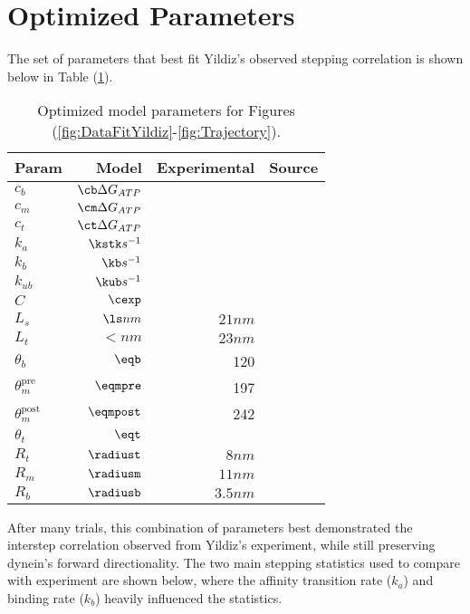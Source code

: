 \section{Optimized Parameters}\label{sec:Params}
The set of parameters that best fit Yildiz's observed stepping correlation is shown below in Table (\ref{tab:params}).

\begin{table}[H]
  \centering
  \begin{tabular}{|l | r | r | r|}
  	\hline
    Param & Model & Experimental & Source \\
    \hline
    $c_b$ & $\cb \Delta G_{ATP}$ &  & \\
    $c_m$ & $\cm \Delta G_{ATP}$ &  & \\
    $c_t$ & $\ct \Delta G_{ATP}$ &  & \\
    $k_a$ & $\kstk s^{-1}$&  & \\
    $k_b$ & $\kb s^{-1}$&  & \\
    $k_{ub}$ & $\kub s^{-1}$ & & \\
    $C$ & $\cexp$ & & \\
    $L_s$ & $\ls nm$ & $21nm$ & \cite{Burgess2003, 3vkh-cite, carter-paper}\\
    $L_t$ & $\lt nm$ & $23nm$ & \cite{Burgess2003, 3vkh-cite, carter-paper}\\
    $\theta_b$ & $\eqb$ &  120 & \cite{leschziner} \\
    $\theta_m^{\mbox{pre}}$ & $\eqmpre$ &  197 & \cite{Burgess2003}\\
    $\theta_m^{\mbox{post}}$ & $\eqmpost$ & 242 & \cite{Burgess2003}\\
    $\theta_t$ & $\eqt$ &  & \\
    $R_t$ & $\radiust$ & $8nm$ & \cite{Burgess2003}\\
    $R_m$ & $\radiusm$ & $11nm$ & \cite{Burgess2003}\\
    $R_b$ & $\radiusb$ & $3.5nm$ & \cite{Burgess2003}\\
    \hline
  \end{tabular}
  \caption{Optimized model parameters for Figures (\ref{fig:DataFitYildiz}-\ref{fig:Trajectory}).}
  \label{tab:params}
\end{table}

After many trials, this combination of parameters best demonstrated the interstep correlation observed from Yildiz's experiment, while still preserving dynein's forward directionality. The two main stepping statistics used to compare with experiment are shown below, where the affinity transition rate ($k_a$) and binding rate ($k_b$) heavily influenced the statistics.  

